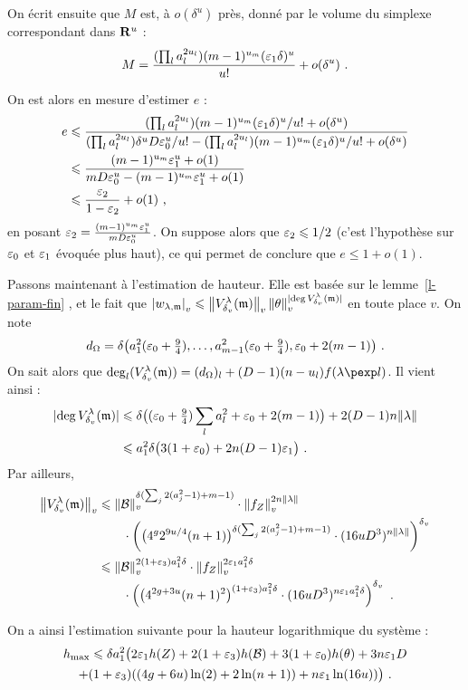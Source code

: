 On écrit ensuite que $M$ est, à $o(\delta^u)$ près, donné par le volume du
simplexe correspondant dans $\mathbf{R}^u$ :
\[
  M = \frac{
    (\prod_l a_l^{2u_l}) (m-1)^{u_m} (\varepsilon_1 \delta)^u}{
    u!}
  + o(\delta^u) \text{ .}
\]

On est alors en mesure d'estimer $e$ :
\begin{align*}
  e
  & \leqslant \frac{
      (\prod_l a_l^{2u_l}) (m-1)^{u_m} (\varepsilon_1 \delta)^u / u! + o(\delta^u)}{
      (\prod_l a_l^{2u_l}) \delta^u D \varepsilon_0^u / u!
      - (\prod_l a_l^{2u_l}) (m-1)^{u_m} (\varepsilon_1 \delta)^u / u! +o(\delta^u)} \\
  & \leqslant \frac{
      (m-1)^{u_m} \varepsilon_1^u + o(1)}{
      mD\varepsilon_0^u - (m-1)^{u_m} \varepsilon_1^u + o(1)} \\
  & \leqslant \frac {\varepsilon_2} {1 - \varepsilon_2} + o(1) \text{ ,}
\end{align*}
en posant $\varepsilon_2 = \frac {(m-1)^{u_m} \varepsilon_1^u} {m D\varepsilon_0^u}$. On
suppose alors que $\varepsilon_2 \leqslant 1/2$ (c'est l'hypothèse sur $\varepsilon_0$ et $\varepsilon_1$
évoquée plus haut), ce qui permet de conclure que $e \le 1 + o(1)$.

Passons maintenant à l'estimation de hauteur. Elle est basée sur le
lemme~\ref{l-param-fin} , et le fait que $\left\lvert w_{\lambda, {\mathfrak m}}\right\rvert_{v} \leqslant
\left\lVert V_{\delta\smash{_v}}^\lambda({\mathfrak m})\right\rVert_{v} \left\lVert\theta\right\rVert_{v}^{{\lvert\deg V_ {\delta\smash{_v}}^{\lambda}({\mathfrak m})\rvert}}$ en
toute place $v$. On note
\[
  d_\Omega = \delta \bigl(a_1^2 (\varepsilon_0 + \tfrac94), \ldots,
  a_{m-1}^2 (\varepsilon_0 + \tfrac94), \varepsilon_0 + 2(m-1) \bigl) \text{ .}
\]
On sait alors que $\deg_l(V_\dv^\lambda(\monome)) = (d_\Omega)_l +
(D-1) (n-u_l) f(\lambda\pexp l)$. Il vient ainsi :
\begin{align*}
  {\lvert\deg V_ {\delta\smash{_v}}^{\lambda}({\mathfrak m})\rvert}
  & \leqslant \delta \bigl( (\varepsilon_0 + \tfrac94) \sum_l a_l^2 + \varepsilon_0 + 2(m-1) \bigr)
    + 2(D-1) n\lVert\lambda\rVert \\
  & \leqslant a_1^2 \delta \bigl( 3(1+\varepsilon_0) + 2n (D-1) \varepsilon_1 \bigr) \text{ .}
\end{align*}
Par ailleurs,
\begin{align*}
  \left\lVert V_{\delta\smash{_v}}^\lambda({\mathfrak m})\right\rVert_{v}
  & \leqslant \left\lVert\mathcal B\right\rVert_{v} ^{\delta(\sum_j 2(a_j^2 -1) + m-1)} \cdot \left\lVert f_Z\right\rVert_{v}^{2n\lVert\lambda\rVert}
    \\ & \qquad \cdot \left(
    \bigl( 4^g 2^{9u/4} (n+1) \bigr)^{\delta(\sum_j 2(a_j^2-1) + m-1)}
    \cdot (16uD^3)^{n\lVert\lambda\rVert}
    \right)^{\delta\smash{_v}} \\
  & \leqslant \left\lVert\mathcal B\right\rVert_{v} ^{2(1+\varepsilon_3) a_1^2\delta} \cdot \left\lVert f_Z\right\rVert_{v}^{2\varepsilon_1 a_1^2\delta}
    \\ & \qquad \cdot \left(
    \bigl( 4^{2g+3u} (n+1)^2 \bigr)^{(1+\varepsilon_3) a_1^2\delta}
    \cdot (16uD^3)^{n\varepsilon_1 a_1^2\delta}
    \right)^{\delta\smash{_v}} \text{ .}
\end{align*}

On a ainsi l'estimation suivante  pour la hauteur logarithmique du système :
\begin{multline*}
  h_{\mathrm{max}} \leqslant \delta a_1^2 \bigl( 2\varepsilon_1 h(Z) + 2(1+\varepsilon_3) h(\mathcal B)
  + 3(1+\varepsilon_0) h(\theta)  + 3n\varepsilon_1D  \\ + (1+\varepsilon_3)((4g+6u)\ln(2)
  + 2\ln(n+1)) + n\varepsilon_1\ln(16u)) \bigr) \text{ .}
\end{multline*}


